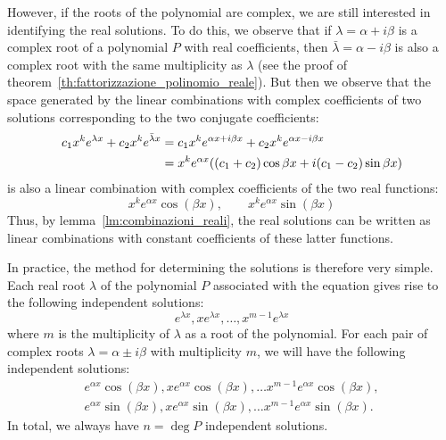 However, if the roots of the polynomial are complex, we are still interested in
identifying
the real solutions.
To do this, we observe that if $\lambda = \alpha + i \beta $ is a complex root
of a polynomial $P$ with real coefficients, then $\bar \lambda =\alpha - i
\beta$ is also a complex root with the same multiplicity as $\lambda$
(see the proof of theorem~\ref{th:fattorizzazione_polinomio_reale}). 
But then we observe that the space generated by the linear combinations with
complex coefficients
of two solutions corresponding to the two conjugate coefficients:
\begin{align*}
  c_1 x^k e^{\lambda x} + c_2  x^k e^{\bar\lambda x}
  &= c_1 x^k e^{\alpha x+i \beta x} + c_2 x^k e^{\alpha x - i \beta x}\\
  &= x^k e^{\alpha x}{\left( (c_1+c_2) \cos \beta x + i (c_1-c_2) \sin \beta x \right)}
\end{align*}
is also a linear combination with complex coefficients of the two real
functions:
\begin{equation}\label{eq:489571798}
  x^k e^{\alpha x} \cos(\beta x), \qquad
  x^k e^{\alpha x} \sin(\beta x)
\end{equation}
Thus, by lemma~\ref{lm:combinazioni_reali}, 
the real solutions can be written as linear combinations with constant
coefficients
of these latter functions.

In practice, the method for determining the solutions is therefore very simple. 
Each real root $\lambda$ of the polynomial $P$ associated with the equation
gives rise
to the following independent solutions:
\[
  e^{\lambda x}, x e^{\lambda x}, \dots, x^{m-1} e^{\lambda x}
\]
where $m$ is the multiplicity of $\lambda$ as a root of the polynomial.
For each pair of complex roots $\lambda = \alpha \pm i \beta$ with multiplicity
$m$,
we will have the following independent solutions:
\begin{gather*}
    e^{\alpha x}\cos(\beta x), x e^{\alpha x}\cos(\beta x), \dots x^{m-1}
  e^{\alpha x}\cos(\beta x),\\
    e^{\alpha x}\sin(\beta x), x e^{\alpha x}\sin(\beta x), \dots x^{m-1}
  e^{\alpha x}\sin(\beta x).
\end{gather*}
In total, we always have $n=\deg P$ independent solutions.

